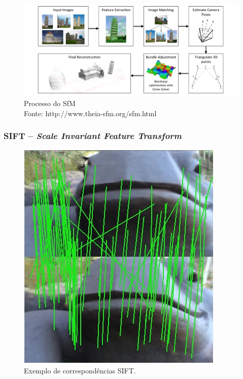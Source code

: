 \documentclass[table, usenames, svgnames, xcolor=dvipsnames]{beamer}
\begin{document}
\begin{frame}
	\begin{center}
		\begin{figure}[!h]
			\centering
			\includegraphics[width=1\linewidth]{figs/pipelinesfm.png}
			\caption{%
				Processo do SfM \\
			\tiny{Fonte: http://www.theia-sfm.org/sfm.html}
			}
		\end{figure}	
	\end{center}
\end{frame}
%

\begin{frame}
\frametitle{\textbf{SIFT -- \emph{Scale Invariant Feature Transform}}}
	\begin{center}		
		\begin{figure}[!h]
			\centering
			\includegraphics[width=0.5\linewidth]{figs/SIFTsapo.jpg}
			\caption{%
				Exemplo de correspondências SIFT.
			}
		\end{figure}
	\end{center}
\end{frame}
\end{document}
